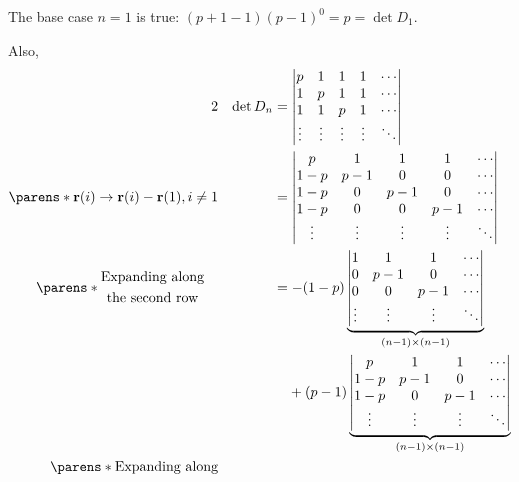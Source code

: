 \documentclass[fleqn,a4paper,11pt]{article}
\begin{document}
\begin{enumerate}[label=\textbf{\arabic*.}]
   The base case \(n = 1\) is true: \((p + 1 - 1)(p - 1)^0 = p = \det D_1\).

   Also,
   \begin{alignat*}2
    && \det D_n
    &= \begin{vmatrix}
     p & 1 & 1 & 1 & \cdots \\
     1 & p & 1 & 1 & \cdots \\
     1 & 1 & p & 1 & \cdots \\
     \vdots & \vdots & \vdots & \vdots & \ddots
    \end{vmatrix} \\
    \parens*{
     \vec r(i) \to \vec r(i) - \vec r(1), i \ne 1
    }
    && &= \begin{vmatrix}
     p & 1 & 1 & 1 & \cdots \\
     1 - p & p - 1 & 0 & 0 & \cdots \\
     1 - p & 0 & p - 1 & 0 & \cdots \\
     1 - p & 0 & 0 & p - 1 & \cdots \\
     \vdots & \vdots & \vdots & \vdots & \ddots
    \end{vmatrix} \\
    \parens*{
     \begin{gathered}
      \text{Expanding along} \\
      \text{the second row}
     \end{gathered}} \quad
    && &= -(1 - p)\underbrace{\begin{vmatrix}
     1 & 1 & 1 & \cdots \\
     0 & p - 1 & 0 & \cdots \\
     0 & 0 & p - 1 & \cdots \\
     \vdots & \vdots & \vdots & \ddots \\
    \end{vmatrix}}_{(n - 1) \times (n - 1)} \\
    && &\phantom{={}} + (p - 1)\underbrace{\begin{vmatrix}
     p & 1 & 1 & \cdots \\
     1 - p & p - 1 & 0 & \cdots \\
     1 - p & 0 & p - 1 & \cdots \\
     \vdots & \vdots & \vdots & \ddots
    \end{vmatrix}}_{(n - 1) \times (n - 1)} \\
    \parens*{
     \begin{gathered}
      \text{Expanding along} \\

\end{gathered}}
\end{alignat*}
\end{enumerate}
\end{document}
